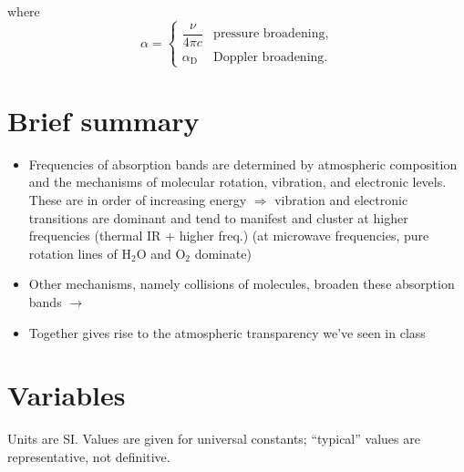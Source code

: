 \documentclass[11pt, oneside]{article}
\begin{document}
\noindent where
\begin{equation}
	\label{e:alpha}
	\alpha = \begin{cases} \dfrac{\nu}{4\pi c} & \text{pressure broadening},\\[1ex] \alpha_\mathrm{D} & \text{Doppler broadening}. \end{cases}
\end{equation}

\section{Brief summary}
\label{s:summary}

\begin{itemize}
	\item[--] Frequencies of absorption bands are determined by atmospheric composition and the mechanisms of molecular rotation, vibration, and electronic levels. These are in order of increasing energy $\Rightarrow$ vibration and electronic transitions are dominant and tend to manifest and cluster at higher frequencies (thermal IR $+$ higher freq.) (at microwave frequencies, pure rotation lines of H$_2$O and O$_2$ dominate)
	\item[--] Other mechanisms, namely collisions of molecules, broaden these absorption bands $\rightarrow$
	\item[--] Together gives rise to the atmospheric transparency we've seen in class
\end{itemize}

\clearpage
\section*{Variables}

Units are SI. Values are given for universal constants; ``typical'' values are representative, not definitive.
\end{document}
